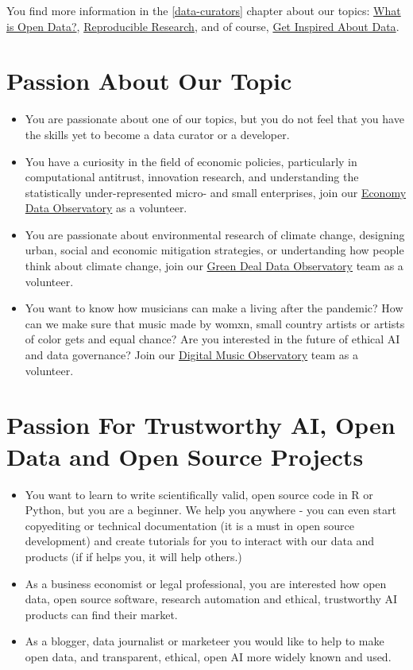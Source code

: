 \documentclass[
  a4paper,
  openany, a4paper, oneside]{book}
\begin{document}
You find more information in the \ref{data-curators} chapter about our topics: \protect\hyperlink{open-data}{What is Open Data?}, \protect\hyperlink{reproducible-research-theory}{Reproducible Research}, and of course, \protect\hyperlink{get-inspired}{Get Inspired About Data}.

\hypertarget{topic-associate}{%
\section{Passion About Our Topic}\label{topic-associate}}

\begin{itemize}
\item
  You are passionate about one of our topics, but you do not feel that you have the skills yet to become a data curator or a developer.
\item
  You have a curiosity in the field of economic policies, particularly in computational antitrust, innovation research, and understanding the statistically under-represented micro- and small enterprises, join our \href{https://economy.dataobservatory.eu/\#contributors}{Economy Data Observatory} as a volunteer.
\item
  You are passionate about environmental research of climate change, designing urban, social and economic mitigation strategies, or undertanding how people think about climate change, join our \href{https://greendeal.dataobservatory.eu/\#contributors}{Green Deal Data Observatory} team as a volunteer.
\item
  You want to know how musicians can make a living after the pandemic? How can we make sure that music made by womxn, small country artists or artists of color gets and equal chance? Are you interested in the future of ethical AI and data governance? Join our \href{https://music.dataobservatory.eu/\#contributors}{Digital Music Observatory} team as a volunteer.
\end{itemize}

\hypertarget{open-associate}{%
\section{Passion For Trustworthy AI, Open Data and Open Source Projects}\label{open-associate}}

\begin{itemize}
\item
  You want to learn to write scientifically valid, open source code in R or Python, but you are a beginner. We help you anywhere - you can even start copyediting or technical documentation (it is a must in open source development) and create tutorials for you to interact with our data and products (if if helps you, it will help others.)
\item
  As a business economist or legal professional, you are interested how open data, open source software, research automation and ethical, trustworthy AI products can find their market.
\item
  As a blogger, data journalist or marketeer you would like to help to make open data, and transparent, ethical, open AI more widely known and used.
\end{itemize}
\end{document}
